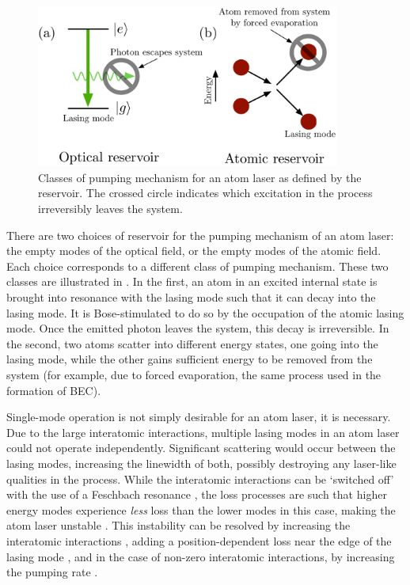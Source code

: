 \begin{figure}
    \centering
    \includegraphics[width=10cm]{ReservoirChoices}
    \caption{
        \label{Introduction:ReservoirChoices}
        Classes of pumping mechanism for an atom laser as defined by the reservoir.  The crossed circle indicates which excitation in the process irreversibly leaves the system.
    }
\end{figure}

There are two choices of reservoir for the pumping mechanism of an atom laser: the empty modes of the optical field, or the empty modes of the atomic field.  Each choice corresponds to a different class of pumping mechanism.  These two classes are illustrated in .  In the first, an atom in an excited internal state is brought into resonance with the lasing mode such that it can decay into the lasing mode.  It is Bose-stimulated to do so by the occupation of the atomic lasing mode.  Once the emitted photon leaves the system, this decay is irreversible.  In the second, two atoms scatter into different energy states, one going into the lasing mode, while the other gains sufficient energy to be removed from the system (for example, due to forced evaporation, the same process used in the formation of BEC).

Single-mode operation is not simply desirable for an atom laser, it is necessary.  Due to the large interatomic interactions, multiple lasing modes in an atom laser could not operate independently.  Significant scattering would occur between the lasing modes, increasing the linewidth of both, possibly destroying any laser-like qualities in the process.  While the interatomic interactions can be `switched off' with the use of a Feschbach resonance \citep{Inouye:1998hy}, the loss processes are such that higher energy modes experience \emph{less} loss than the lower modes in this case, making the atom laser unstable \citep{Haine:2002kp}.  This instability can be resolved by increasing the interatomic interactions \citep{Haine:2002kp}, adding a position-dependent loss near the edge of the lasing mode \citep{Kneer:1998fk}, and in the case of non-zero interatomic interactions, by increasing the pumping rate \citep{Robins:2001pd}.


